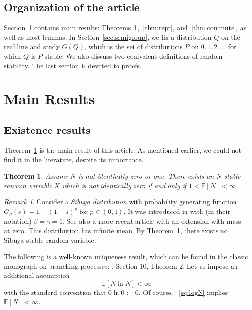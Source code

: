 \documentclass[12pt]{amsart}
\newtheorem{theorem}{Theorem}[section]
\theoremstyle{remark}
\newtheorem{remark}{Remark}[section]
\theoremstyle{definition}
\begin{document}
\subsection{Organization of the article}
Section~\ref{sec:main} contains main results: Theorems~\ref{thm:main},~\ref{thm:repr}, and~\ref{thm:commute}, as well as most lemmas. In Section~\ref{sec:semigroup}, we fix a distribution $Q$ on the real line and study $G(Q)$, which is the set of distributions $P$ on $0, 1, 2, \ldots$ for which $Q$ is $P$-stable. We also discuss two equivalent definitions of random stability.  The last section is devoted to proofs. 

\section{Main Results}
\label{sec:main}

\subsection{Existence results} Theorem~\ref{thm:main} is the main result of this article. As mentioned earlier, we could not find it in the literature, despite its importance. 

\begin{theorem} Assume $N$ is not identically zero or one. There exists an $N$-stable random variable $X$ which is not identically zero if and only if $1 < \mathbb E[N] < \infty$.  
\label{thm:main}
\end{theorem}

\begin{remark} 
Consider a {\it Sibuya distribution} with probability generating function $G_p(s) = 1 - (1 - s)^p$ for $p \in (0, 1)$. It was introduced in \cite[formula (2)]{S} with (in their notation) $\beta = \gamma = 1$. See also a more recent article \cite{Sibuya} with an extension with mass at zero. This distribution has infinite mean. By Theorem~\ref{thm:main}, there exists no Sibuya-stable random variable. 
\label{rmk:Sibuya}
\end{remark}

The following is a well-known uniqueness result, which can be found in the classic monograph on branching processes: \cite[Chapter I]{AthreyaBook}, Section 10, Theorem 2. Let us impose an additional assumption 
\begin{equation}
\label{eq:logN}
\mathbb E[N\ln N] < \infty
\end{equation}
with the standard convention that $0 \ln 0 := 0$. Of course, ~\eqref{eq:logN} implies $\mathbb E[N] < \infty$. 
\end{document}
